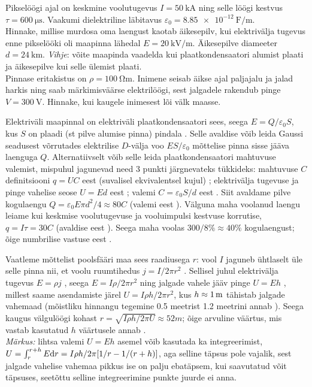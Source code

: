 
Pikselöögi ajal on keskmine voolutugevus $I=\qty{50}{\kA}$ ning selle löögi kestvus
$\tau=\qty{600}{\us}$. Vaakumi dielektriline läbitavus $\varepsilon_0=\qty{8.85e-12}{\F\per\m}$.\\
\osa Hinnake, millise murdosa oma laengust kaotab äikesepilv, kui elektrivälja tugevus enne pikselööki oli maapinna lähedal $E=\qty{20}{\kV\per\m}$.  Äikesepilve diameeter $d=\qty{24}{\km}$. \emph{Vihje}: võite maapinda vaadelda kui plaatkondensaatori alumist plaati ja äikesepilve kui selle ülemist plaati.\\
\osa Pinnase eritakistus on $\rho = \qty{100}{\ohm\m}$. Inimene seisab äikse ajal paljajalu ja jalad harkis ning saab märkimisväärse elektrilöögi, sest jalgadele rakendub pinge $V=\qty{300}{\V}$. Hinnake, kui kaugele inimesest lõi välk maasse.



\hint

\solu
\osa Elektriväli maapinnal on elektriväli plaatkondensaatori sees, seega $E=Q/\varepsilon_0S$, kus $S$ on plaadi (st pilve alumise pinna) pindala . Selle avaldise võib leida Gaussi seadusest võrrutades elektrilise $D$-välja voo $ES/\varepsilon_0$ mõttelise pinna sisse jääva laenguga $Q$. Alternatiivselt võib selle leida plaatkondensaatori mahtuvuse valemist, mispuhul jagunevad need 3 punkti järgnevateks tükkideks: mahtuvuse $C$ definitsiooni $q=UC$ eest (suvalisel ekvivalentsel kujul) ; elektrivälja tugevuse ja pinge vahelise seose $U=Ed$ eest ; valemi $C=\varepsilon_0S/d$ eest . Siit avaldame pilve kogulaengu $Q=\varepsilon_0E\pi d^2/4\approx\SI{80}C$ (valemi eest ). Välguna maha voolanud laengu leiame kui keskmise voolutugevuse ja vooluimpulsi kestvuse korrutise, $q=I\tau=\SI{30}C$ (avaldise eest ). Seega maha voolas $300/8\%\approx 40\%$ kogulaengust; õige numbrilise vastuse eest .

\osa Vaatleme mõttelist poolsfääri maa sees raadiusega $r$: vool $I$ jaguneb ühtlaselt üle selle pinna nii, et voolu ruumtihedus $j=I/2\pi r^2$ . Sellisel juhul elektrivälja tugevus $E=\rho j$ , seega $E=I\rho/2\pi r^2$ ning jalgade vahele jääv pinge $U=Eh$ , millest saame asendamiste järel $U=I\rho h/2\pi r^2$, kus $h\approx\SI 1m$ tähistab jalgade vahemaad (mõistliku hinnangu tegemine \num{0.5} meetrist \num{1.2} meetrini annab ). Seega kaugus välgulöögi kohast $r=\sqrt{I\rho h/2\pi U}\approx\SI{52}m$; õige arvuline väärtus, mis vastab kasutatud $h$ väärtusele annab  .
\\\emph{Märkus:} lihtsa valemi $U=Eh$ asemel võib kasutada ka integreerimist, $U=\int_r^{r+h} E\textrm dr=I\rho h/2\pi[1/r-1/(r+h)]$, aga selline täpsus pole vajalik, sest jalgade vahelise vahemaa pikkus ise on palju ebatäpsem, kui saavutatud võit täpsuses, seetõttu selline integreerimine punkte juurde ei anna.
\probend